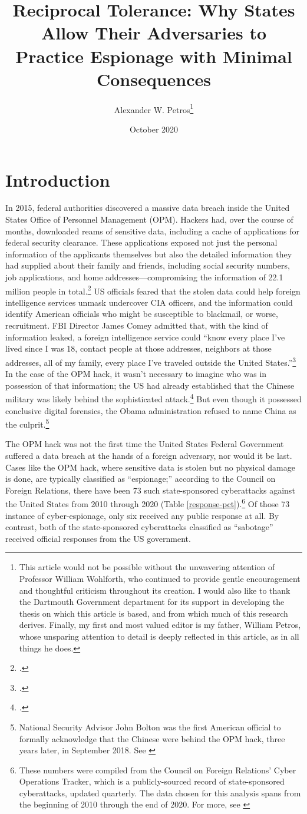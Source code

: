 \documentclass[12pt]{extarticle}
\title{Reciprocal Tolerance: Why States Allow Their Adversaries to Practice Espionage with Minimal Consequences}
\author{Alexander W. Petros\thanks{This article would not be possible without the unwavering attention of Professor William Wohlforth, who continued to provide gentle encouragement and thoughtful criticism throughout its creation. I would also like to thank the Dartmouth Government department for its support in developing the thesis on which this article is based, and from which much of this research derives. Finally, my first and most valued editor is my father, William Petros, whose unsparing attention to detail is deeply reflected in this article, as in all things he does.}}
\date{October 2020}
\begin{document}
\maketitle
\newpage

\newpage
\section{Introduction}
In 2015, federal authorities discovered a massive data breach inside the United States Office of Personnel Management (OPM). Hackers had, over the course of months, downloaded reams of sensitive data, including a cache of applications for federal security clearance. These applications exposed not just the personal information of the applicants themselves but also the detailed information they had supplied about their family and friends, including social security numbers, job applications, and home addresses---compromising the information of 22.1 million people in total.\footcite{nakashima_hacks_2015} US officials feared that the stolen data could help foreign intelligence services unmask undercover CIA officers, and the information could identify American officials who might be susceptible to blackmail, or worse, recruitment. FBI Director James Comey admitted that, with the kind of information leaked, a foreign intelligence service could ``know every place I've lived since I was 18, contact people at those addresses, neighbors at those addresses, all of my family, every place I've traveled outside the United States.''\footcite[Comey is referring specifically to his SF-86, the form that one files with OPM to apply for a security clearance.]{nakashima_hacks_2015} In the case of the OPM hack, it wasn't necessary to imagine who was in possession of that information; the US had already established that the Chinese military was likely behind the sophisticated attack.\footcite{koerner_inside_2016} But even though it possessed conclusive digital forensics, the Obama administration refused to name China as the culprit.\footnote{National Security Advisor John Bolton was the first American official to formally acknowledge that the Chinese were behind the OPM hack, three years later, in September 2018. See \cite{sanger_trump_2018}}

The OPM hack was not the first time the United States Federal Government suffered a data breach at the hands of a foreign adversary, nor would it be last. Cases like the OPM hack, where sensitive data is stolen but no physical damage is done, are typically classified as \enquote{espionage;} according to the Council on Foreign Relations, there have been 73 such state-sponsored cyberattacks against the United States from 2010 through 2020 (Table \ref{response-pct}).\footnote{These numbers were compiled from the Council on Foreign Relations' Cyber Operations Tracker, which is a publicly-sourced record of state-sponsored cyberattacks, updated quarterly. The data chosen for this analysis spans from the beginning of 2010 through the end of 2020. For more, see \cite{council_on_foreign_relations_new_2019}} Of those 73 instance of cyber-espionage, only six received any public response at all. By contrast, both of the state-sponsored cyberattacks classified as \enquote{sabotage} received official responses from the US government.
\end{document}
